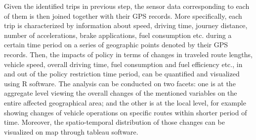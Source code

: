 \documentclass[preprint,12pt,3p]{elsarticle}
\begin{document}
Given the identified trips in previous step, the sensor data corresponding to each of them is then joined together with their GPS records. More specifically, each trip is characterized by information about speed, driving time, journey distance, number of accelerations, brake applications, fuel consumption etc. during a certain time period on a series of geographic points denoted by their GPS records. Then, the impacts of policy in terms of changes in traveled route lengths, vehicle speed, overall driving time, fuel consumption and fuel efficiency etc., in and out of the policy restriction time period, can be quantified and visualized using R software. The analysis can be conducted on two facets: one is at the aggregate level viewing the overall changes of the mentioned variables on the entire affected geographical area; and the other is at the local level, for example showing changes of vehicle operations on specific routes within shorter period of time. Moreover, the spatio-temporal distribution of those changes can be visualized on map through tableau software.
\end{document}
